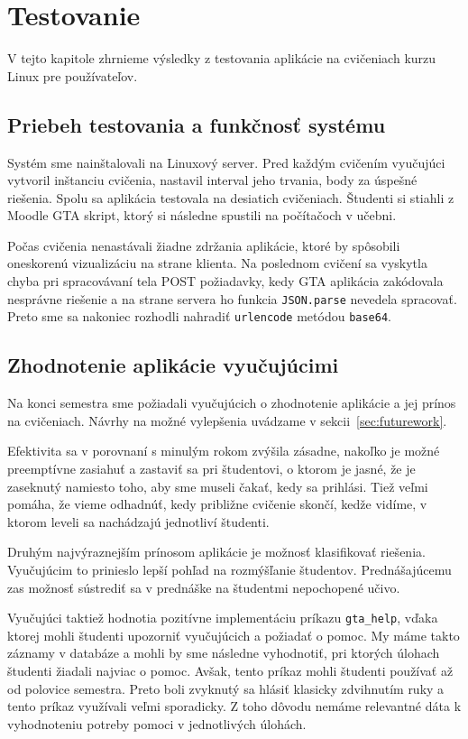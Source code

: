 \chapter{Testovanie}
\label{kap:testovanie}

V tejto kapitole zhrnieme výsledky z testovania aplikácie na cvičeniach kurzu Linux
pre používateľov.

\section{Priebeh testovania a funkčnosť systému}
\label{sec:funkcnost}

Systém sme nainštalovali na Linuxový server. Pred každým cvičením vyučujúci vytvoril
inštanciu cvičenia, nastavil interval jeho trvania, body za úspešné riešenia.
Spolu sa aplikácia testovala na desiatich cvičeniach. Študenti si stiahli z Moodle
GTA skript, ktorý si následne spustili na počítačoch v učebni.

Počas cvičenia nenastávali žiadne zdržania aplikácie, ktoré by spôsobili oneskorenú
vizualizáciu na strane klienta. Na poslednom cvičení sa vyskytla chyba pri spracovávaní
tela POST požiadavky, kedy GTA aplikácia zakódovala nesprávne riešenie a na strane
servera ho funkcia \verb'JSON.parse' nevedela spracovať. Preto sme sa nakoniec rozhodli
nahradiť \verb'urlencode' metódou \verb'base64'.


\section{Zhodnotenie aplikácie vyučujúcimi}
\label{sec:zhodnotenie}

Na konci semestra sme požiadali vyučujúcich o zhodnotenie aplikácie a jej prínos
na cvičeniach. Návrhy na možné vylepšenia uvádzame v sekcii~\ref{sec:futurework}.

Efektivita sa v porovnaní s minulým rokom zvýšila zásadne, nakoľko je možné preemptívne
zasiahuť a zastaviť sa pri študentovi, o ktorom je jasné, že je zaseknutý namiesto
toho, aby sme museli čakať, kedy sa prihlási. Tiež veľmi pomáha, že vieme odhadnúť,
kedy približne cvičenie skončí, kedže vidíme, v ktorom leveli sa nachádzajú jednotliví
študenti.

Druhým najvýraznejším prínosom aplikácie je možnosť klasifikovať riešenia.
Vyučujúcim to prinieslo lepší pohľad na rozmýšľanie študentov. Prednášajúcemu zas
možnosť sústrediť sa v prednáške na študentmi nepochopené učivo.

Vyučujúci taktiež hodnotia pozitívne implementáciu príkazu \verb'gta_help', vďaka
ktorej mohli študenti upozorniť vyučujúcich a požiadať o pomoc. My máme takto záznamy
v databáze a mohli by sme následne vyhodnotiť, pri ktorých úlohach študenti žiadali
najviac o pomoc. Avšak, tento príkaz mohli študenti používať až od polovice semestra.
Preto boli zvyknutý sa hlásiť klasicky zdvihnutím ruky a tento príkaz
využívali veľmi sporadicky. Z toho dôvodu nemáme relevantné dáta k vyhodnoteniu
potreby pomoci v jednotlivých úlohách.

